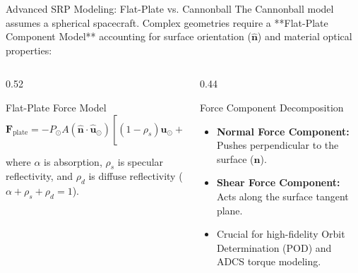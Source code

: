 \documentclass[aspectratio=169,11pt]{beamer}
\begin{document}
\begin{frame}{Advanced SRP Modeling: Flat-Plate vs. Cannonball}
    The Cannonball model assumes a spherical spacecraft. Complex geometries require a **Flat-Plate Component Model** accounting for surface orientation ($\hat{\mathbf{n}}$) and material optical properties:

    \begin{columns}[t]
        \begin{column}{0.52\textwidth}
            \begin{block}{Flat-Plate Force Model}
                \begin{equation*}
                    \mathbf{F}_{\text{plate}} = -P_{\odot} A (\hat{\mathbf{n}} \cdot \hat{\mathbf{u}}_{\odot}) \left[ (1 - \rho_s) \hat{\mathbf{u}}_{\odot} + \left( 2\rho_s (\hat{\mathbf{n}} \cdot \hat{\mathbf{u}}_{\odot}) + \frac{2}{3}\rho_d \right) \hat{\mathbf{n}} \right]
                \end{equation*}
            \end{block}
            \small
            where $\alpha$ is absorption, $\rho_s$ is specular reflectivity, and $\rho_d$ is diffuse reflectivity ($\alpha + \rho_s + \rho_d = 1$).
        \end{column}

        \begin{column}{0.44\textwidth}
            \begin{block}{Force Component Decomposition}
                \begin{itemize}
                    \item \textbf{Normal Force Component:} Pushes perpendicular to the surface ($\hat{\mathbf{n}}$).
                    \item \textbf{Shear Force Component:} Acts along the surface tangent plane.
                    \item Crucial for high-fidelity Orbit Determination (POD) and ADCS torque modeling.
                \end{itemize}
            \end{block}
        \end{column}
    \end{columns}
\end{frame}
\end{document}
